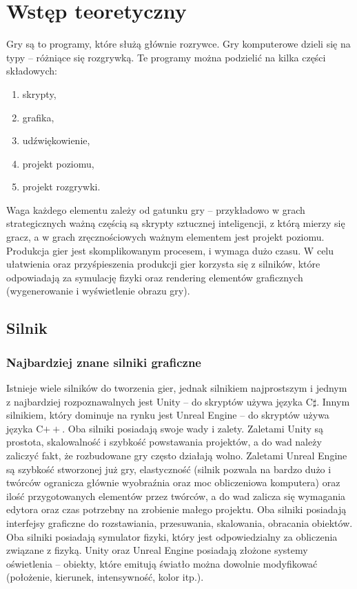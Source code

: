\documentclass[12pt,twoside]{article}
\begin{document}
\clearpage

\section{Wstęp teoretyczny}

Gry są to programy, które służą głównie rozrywce. Gry komputerowe dzieli się  
na typy -- różniące się rozgrywką. Te programy można podzielić na kilka części składowych: 
\begin{enumerate}
 \item skrypty, 
 \item grafika, 
 \item udźwiękowienie, 
 \item projekt poziomu, 
 \item projekt rozgrywki.
\end{enumerate}
Waga każdego elementu zależy od gatunku gry -- przykładowo w grach strategicznych
ważną częścią są skrypty sztucznej inteligencji, z którą mierzy się gracz, a w
grach zręcznościowych ważnym elementem jest projekt poziomu. Produkcja gier jest
skomplikowanym procesem, i wymaga dużo czasu. W celu ułatwienia oraz
przyśpieszenia produkcji gier korzysta się z silników, które odpowiadają za
symulację fizyki oraz rendering elementów graficznych (wygenerowanie i
wyświetlenie obrazu gry). 
\subsection{Silnik}
\subsubsection{Najbardziej znane silniki graficzne}

Istnieje wiele silników do tworzenia gier, jednak silnikiem najprostszym i
jednym z najbardziej rozpoznawalnych jest Unity\cite{UnityPAGE} -- do skryptów używa języka
C$\sharp$. Innym silnikiem, który dominuje na rynku jest Unreal Engine\cite{UnrealPAGE} -- do
skryptów używa języka C$++$. Oba silniki posiadają swoje wady i zalety. Zaletami
Unity są prostota, skalowalność i szybkość powstawania projektów, a do wad
należy zaliczyć fakt, że rozbudowane gry często działają wolno. Zaletami Unreal
Engine są szybkość stworzonej już gry, elastyczność (silnik pozwala na bardzo
dużo i twórców ogranicza głównie wyobraźnia oraz moc obliczeniowa komputera)
oraz ilość przygotowanych elementów przez twórców, a do wad zalicza się
wymagania edytora oraz czas potrzebny na zrobienie małego projektu. Oba silniki
posiadają interfejsy graficzne do rozstawiania, przesuwania, skalowania,
obracania obiektów. Oba silniki posiadają symulator fizyki, który jest
odpowiedzialny za obliczenia związane z fizyką. Unity oraz Unreal Engine
posiadają złożone systemy oświetlenia -- obiekty, które emitują światło można
dowolnie modyfikować (położenie, kierunek, intensywność, kolor itp.)\cite{UnityVSUnreal}. 
\end{document}
